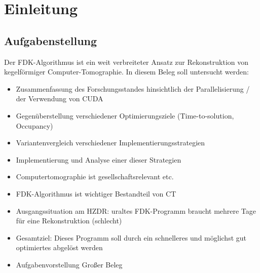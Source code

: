 \chapter{Einleitung}

\section{Aufgabenstellung}

Der FDK-Algorithmus ist ein weit verbreiteter Ansatz zur Rekonstruktion von kegelförmiger Computer-Tomographie. In
diesem Beleg soll untersucht werden:

\begin{itemize}
    \item Zusammenfassung des Forschungsstandes hinsichtlich der Parallelisierung / der Verwendung von CUDA
    \item Gegenüberstellung verschiedener Optimierungsziele (Time-to-solution, Occupancy)
    \item Variantenvergleich verschiedener Implementierungsstrategien
    \item Implementierung und Analyse einer dieser Strategien
\end{itemize}

\begin{itemize}
    \item Computertomographie ist gesellschaftsrelevant etc.
    \item FDK-Algorithmus ist wichtiger Bestandteil von CT
    \item Ausgangssituation am HZDR: uraltes FDK-Programm braucht mehrere Tage für eine Rekonstruktion (schlecht)
    \item Gesamtziel: Dieses Programm soll durch ein schnelleres und möglichst gut optimiertes abgelöst werden
    \item Aufgabenvorstellung Großer Beleg
\end{itemize}
